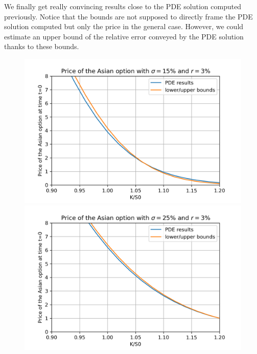 \documentclass{article}
\begin{document}
We finally get really convincing results close to the PDE solution computed previously.
Notice that the bounds are not supposed to directly frame the PDE solution computed but only the price in the general case. However, we could estimate an upper bound of the relative error conveyed by the PDE solution thanks to these bounds. \\
\begin{figure}[h]
  \centering
  \begin{minipage}{0.5\textwidth}
    \centering
    \includegraphics[width=\textwidth]{charts/Price_bounds15.png}
    
  \end{minipage}\hfill
  \begin{minipage}{0.5\textwidth}
    \centering
    \includegraphics[width=\textwidth]{charts/Price_bounds25.png}
   
  \end{minipage}
\end{figure}
\end{document}
